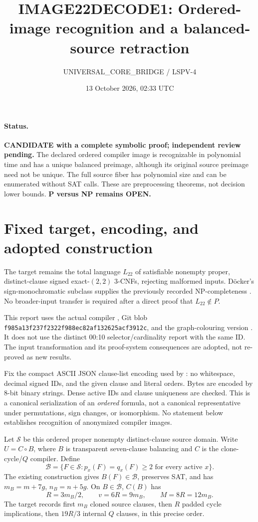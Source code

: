 \documentclass[11pt]{article}
\title{IMAGE22DECODE1: Ordered-image recognition and a balanced-source retraction}
\author{UNIVERSAL\_CORE\_BRIDGE / LSPV-4}
\date{13 October 2026, 02:33 UTC}
\begin{document}
\maketitle

\paragraph{Status.}
\textbf{CANDIDATE with a complete symbolic proof; independent review pending.}
The declared ordered compiler image is recognizable in polynomial time and
has a unique balanced preimage, although its original source preimage need
not be unique. The full source fiber has polynomial size and can be enumerated
without SAT calls. These are preprocessing theorems, not decision lower bounds.
\textbf{P versus NP remains OPEN.}

\section{Fixed target, encoding, and adopted construction}
The target remains the total language $L_{22}$ of satisfiable nonempty proper,
distinct-clause signed exact-$(2,2)$ 3-CNFs, rejecting malformed inputs.
D\"ocker's sign-monochromatic subclass supplies the previously recorded
NP-completeness \cite{docker}. No broader-input transfer is required after a
direct proof that $L_{22}\notin P$.

This report uses the actual compiler
, Git blob
\texttt{f985a13f237f2322f988ec82af132625acf3912c}, and the graph-colouring version
.
It does not use the distinct 00:10 selector/cardinality report with the same ID.
The input transformation and its proof-system consequences are adopted, not
re-proved as new results.

Fix the compact ASCII JSON clause-list encoding used by
: no whitespace, decimal
signed IDs, and the given clause and literal orders. Bytes are encoded by
8-bit binary strings. Dense active IDs and clause uniqueness are checked.
This is a canonical serialization of an \emph{ordered} formula, not a
canonical representative under permutations, sign changes, or isomorphism.
No statement below establishes recognition of anonymized compiler images.

Let $\mathcal S$ be this ordered proper nonempty distinct-clause source domain.
Write $U=C\circ B$, where $B$ is transparent seven-clause balancing and $C$
is the clone-cycle/$Q$ compiler. Define
\[
 \mathcal B=\{F\in\mathcal S:p_x(F)=q_x(F)\ge2\text{ for every active }x\}.
\]
The existing construction gives $B(F)\in\mathcal B$, preserves SAT, and has
$m_B=m+7g$, $n_B=n+5g$. On $B\in\mathcal B$, $C(B)$ has
\[
 R=3m_B/2,\qquad v=6R=9m_B,\qquad M=8R=12m_B.                 \tag{1}
\]
The target records first $m_B$ cloned source clauses, then $R$ padded cycle
implications, then $19R/3$ internal $Q$ clauses, in this precise order.
\end{document}
